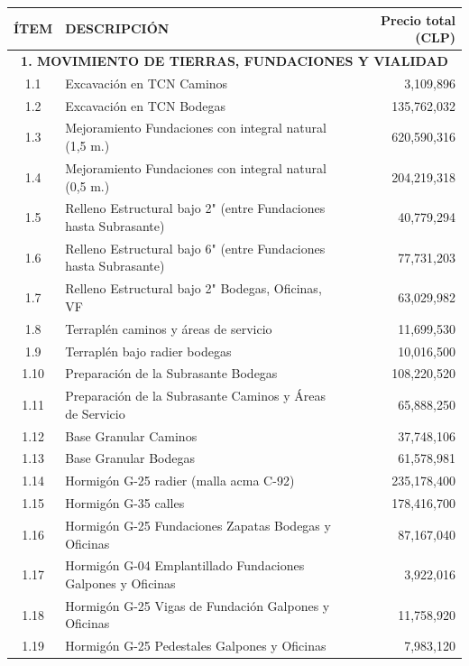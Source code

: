 \documentclass{article} %
\begin{document}
\begin{table}[H]
    \centering
    \begin{tabular}{|c|l|r|}
    \hline
    \textbf{ÍTEM} & \textbf{DESCRIPCIÓN} & \textbf{Precio total (CLP)} \\ \hline
    \multicolumn{3}{|c|}{\textbf{1. MOVIMIENTO DE TIERRAS, FUNDACIONES Y VIALIDAD}} \\ \hline
    1.1 & Excavación en TCN Caminos & 3,109,896 \\ \hline
    1.2 & Excavación en TCN Bodegas & 135,762,032 \\ \hline
    1.3 & Mejoramiento Fundaciones con integral natural (1,5 m.) & 620,590,316 \\ \hline
    1.4 & Mejoramiento Fundaciones con integral natural (0,5 m.) & 204,219,318 \\ \hline
    1.5 & Relleno Estructural bajo 2" (entre Fundaciones hasta Subrasante) & 40,779,294 \\ \hline
    1.6 & Relleno Estructural bajo 6" (entre Fundaciones hasta Subrasante) & 77,731,203 \\ \hline
    1.7 & Relleno Estructural bajo 2" Bodegas, Oficinas, VF & 63,029,982 \\ \hline
    1.8 & Terraplén caminos y áreas de servicio & 11,699,530 \\ \hline
    1.9 & Terraplén bajo radier bodegas & 10,016,500 \\ \hline
    1.10 & Preparación de la Subrasante Bodegas & 108,220,520 \\ \hline
    1.11 & Preparación de la Subrasante Caminos y Áreas de Servicio & 65,888,250 \\ \hline
    1.12 & Base Granular Caminos & 37,748,106 \\ \hline
    1.13 & Base Granular Bodegas & 61,578,981 \\ \hline
    1.14 & Hormigón G-25 radier (malla acma C-92) & 235,178,400 \\ \hline
    1.15 & Hormigón G-35 calles & 178,416,700 \\ \hline
    1.16 & Hormigón G-25 Fundaciones Zapatas Bodegas y Oficinas & 87,167,040 \\ \hline
    1.17 & Hormigón G-04 Emplantillado Fundaciones Galpones y Oficinas & 3,922,016 \\ \hline
    1.18 & Hormigón G-25 Vigas de Fundación Galpones y Oficinas & 11,758,920 \\ \hline
    1.19 & Hormigón G-25 Pedestales Galpones y Oficinas & 7,983,120 \\ \hline

\end{tabular}
\end{table}
\end{document}
